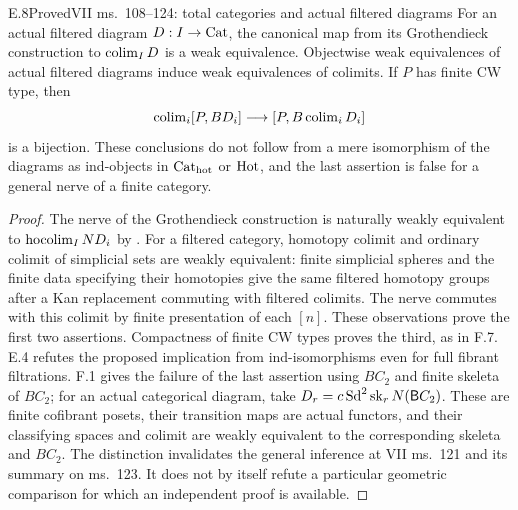 \begin{claim}{E.8}{Proved}{VII ms.~108--124: total categories and actual filtered diagrams}
For an actual filtered diagram $D:I\to\mathrm{Cat}$, the canonical map from its Grothendieck construction to $\operatorname{colim}_I D$ is a weak equivalence. Objectwise weak equivalences of actual filtered diagrams induce weak equivalences of colimits. If $P$ has finite CW type, then
\[
 \operatorname{colim}_i[P,BD_i]\longrightarrow[P,B\operatorname{colim}_iD_i]
\]
is a bijection. These conclusions do not follow from a mere isomorphism of the diagrams as ind-objects in ${\mathrm{Cat}_{\mathrm{hot}}}$ or $\mathrm{Hot}$, and the last assertion is false for a general nerve of a finite category.
\end{claim}
\begin{proof}
The nerve of the Grothendieck construction is naturally weakly equivalent to $\operatorname{hocolim}_I ND_i$ by \citet[Theorem~26.8 and Corollary~26.9]{ChacholskiScherer2001}. For a filtered category, homotopy colimit and ordinary colimit of simplicial sets are weakly equivalent: finite simplicial spheres and the finite data specifying their homotopies give the same filtered homotopy groups after a Kan replacement commuting with filtered colimits. The nerve commutes with this colimit by finite presentation of each $[n]$. These observations prove the first two assertions. Compactness of finite CW types proves the third, as in F.7. E.4 refutes the proposed implication from ind-isomorphisms even for full fibrant filtrations. F.1 gives the failure of the last assertion using $BC_2$ and finite skeleta of $BC_2$; for an actual categorical diagram, take $D_r=c\operatorname{Sd}^2\operatorname{sk}_rN(\mathsf BC_2)$. These are finite cofibrant posets, their transition maps are actual functors, and their classifying spaces and colimit are weakly equivalent to the corresponding skeleta and $BC_2$. The distinction invalidates the general inference at VII ms.~121 and its summary on ms.~123. It does not by itself refute a particular geometric comparison for which an independent proof is available.
\end{proof}

